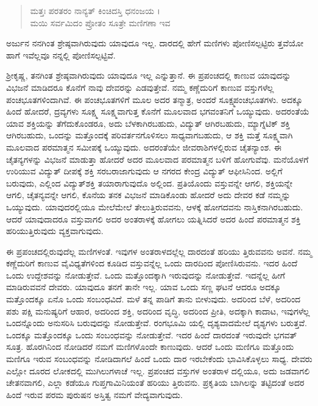 \begin{verse}
ಮತ್ತಃ ಪರತರಂ ನಾನ್ಯತ್ ಕಿಂಚಿದಸ್ತಿ ಧನಂಜಯ ।\\ಮಯಿ ಸರ್ವಮಿದಂ ಪ್ರೋತಂ ಸೂತ್ರೇ ಮಣಿಗಣಾ ಇವ 
\end{verse}

{\small ಅರ್ಜುನ ನನಗಿಂತ ಶ್ರೇಷ್ಠವಾಗಿರುವುದು ಯಾವುದೂ ಇಲ್ಲ. ದಾರದಲ್ಲಿ ಹೇಗೆ ಮಣಿಗಳು ಪೋಣಿಸಲ್ಪಟ್ಟಿರು ತ್ತವೆಯೋ ಹಾಗೆ ಇವೆಲ್ಲವೂ ನನ್ನಲ್ಲಿ ಪೋಣಿಸಲ್ಪಟ್ಟಿವೆ.}

ಶ್ರೀಕೃಷ್ಣ, ತನಗಿಂತ ಶ್ರೇಷ್ಠವಾಗಿರುವುದು ಯಾವುದೂ ಇಲ್ಲ ಎನ್ನುತ್ತಾನೆ. ಈ ಪ್ರಪಂಚದಲ್ಲಿ ಕಾಣುವ ಯಾವುದನ್ನು ವಿಭಜನೆ ಮಾಡಿದರೂ ಕೊನೆಗೆ ನಾವು ದೇವರನ್ನು ಎಡವುತ್ತೇವೆ. ನಮ್ಮ ಕಣ್ಣೆದುರಿಗೆ ಕಾಣುವ ವಸ್ತುಗಳೆಲ್ಲ ಪಂಚಭೂತಗಳಿಂದಾಗಿವೆ. ಈ ಪಂಚಭೂತಗಳಿಗೆ ಮೂಲ ಅದರ ತನ್ಮಾತ್ರ, ಅಂದರೆ ಸೂಕ್ಷ್ಮಪಂಚಭೂತಗಳು. ಅದಕ್ಕೂ ಹಿಂದೆ ಹೋದರೆ, ದ್ರವ್ಯಗಳು ಸೂಕ್ಷ್ಮ ಸೂಕ್ಷ್ಮವಾಗುತ್ತ ಕೊನೆಗೆ ಮೂಲವಾದ ಭಗವಂತನಿಗೆ ಒಯ್ಯುವುದು. ಅದರಂತೆಯೆ ಯಾವ ಶಕ್ತಿಯನ್ನು ತೆಗೆದುಕೊಂಡರೂ, ಅದು ಬೆಳಕಾಗಿರಬಹುದು, ವಿದ್ಯುತ್ ಆಗಿರಬಹುದು, ಮ್ಯಾಗ್ನೆಟಿಕ್ ಶಕ್ತಿ ಆಗಿರಬಹುದು, ಒಂದನ್ನು ಮತ್ತೊಂದಕ್ಕೆ ಪರಿವರ್ತನಗೊಳಿಸಲು ಸಾಧ್ಯವಾಗಬಹುದು, ಆ ಶಕ್ತಿ ಮತ್ತೆ ಸೂಕ್ಷ್ಮವಾಗಿ ಮೂಲವಾದ ಪರಮಾತ್ಮನ ಸಮೀಪಕ್ಕೆ ಒಯ್ಯುವುದು. ಅದರಂತೆಯೇ ಜೀವರಾಶಿಗಳಲ್ಲಿರುವ ಚೈತನ್ಯಾಂಶ. ಈ ಚೈತನ್ಯಗಳನ್ನು ವಿಭಜನೆ ಮಾಡುತ್ತಾ ಹೋದರೆ ಅದರ ಮೂಲವಾದ ಪರಮಾತ್ಮನ ಬಳಿಗೆ ಹೋಗುವೆವು. ಮನೆಯೊಳಗೆ ಉರಿಯುವ ವಿದ್ಯುತ್ ದೀಪಕ್ಕೆ ಶಕ್ತಿ ಸರಬರಾಜಾಗುವುದು ಆ ನಗರದ ಕೇಂದ್ರ ವಿದ್ಯುತ್ ಆಫೀಸಿನಿಂದ. ಅಲ್ಲಿಗೆ ಬರುವುದು, ಎಲ್ಲಿಂದ ವಿದ್ಯುತ್​ಶಕ್ತಿ ತಯಾರಾಗುವುದೊ ಅಲ್ಲಿಂದ. ಪ್ರತಿಯೊಂದು ವಸ್ತುವನ್ನೇ ಆಗಲಿ, ಶಕ್ತಿಯನ್ನೇ ಆಗಲಿ, ಚೈತನ್ಯವನ್ನೇ ಆಗಲಿ, ಕೊನೆಯ ತನಕ ವಿಭಜನೆ ಮಾಡಿಕೊಂಡು ಹೋದರೆ ಅದು ದೇವರ ಕಡೆ ನಮ್ಮನ್ನು ಒಯ್ಯುವುದು. ಯಾವುದರಲ್ಲಿಯೂ ಮೇಲೆಮೇಲೆ ತೇಲುತ್ತಿರುವವನು, ಆಳಕ್ಕೆ ಹೋಗದವನು ನಾಸ್ತಿಕನಾಗಿರಬಹುದು. ಆದರೆ ಯಾವುದಾದರೂ ವಸ್ತುವಾಗಲಿ ಅದರ ಅಂತರಾಳಕ್ಕೆ ಹೋಗಲು ಯತ್ನಿಸಿದರೆ ಅದರ ಹಿಂದೆ ಪರಮಾತ್ಮನ ಶಕ್ತಿ ಹರಿಯುತ್ತಿರುವುದು ವ್ಯಕ್ತವಾಗುವುದು.

ಈ ಪ್ರಪಂಚದಲ್ಲಿರುವುದೆಲ್ಲ ಮಣಿಗಳಂತೆ. ಇವುಗಳ ಅಂತರಾಳದಲ್ಲೆಲ್ಲ ದಾರದಂತೆ ಹರಿಯು ತ್ತಿರುವವನು ಅವನೆ. ನಮ್ಮ ಕಣ್ಣೆದುರಿಗೆ ಕಾಣುವ ವೈವಿಧ್ಯತೆಗಳಿಂದ ಕೂಡಿದ ವಸ್ತುವನ್ನೆಲ್ಲ ಒಂದು ದಾರದಿಂದ ಪೋಣಿಸಿರುವನು. ಇದರ ಹಿಂದೆ ಒಂದು ಉದ್ದೇಶವನ್ನು ನೋಡುತ್ತೇವೆ. ಒಂದು ಮತ್ತೊಂದಕ್ಕಾಗಿ ಇರುವುದನ್ನು ನೋಡುತ್ತೇವೆ. ಇದನ್ನೆಲ್ಲ ಹೀಗೆ ಮಾಡಿರುವವನೆ ದೇವರು. ಯಾವುದೂ ತನಗೆ ತಾನೇ ಇಲ್ಲ. ಯಾವ ಒಂದು ಸಣ್ಣ ಘಟನೆ ಆದರೂ ಅದಕ್ಕೂ ಮತ್ತೊಂದಕ್ಕೂ ಏನೊ ಒಂದು ಸಂಬಂಧವಿದೆ. ಮಳೆ ತನ್ನ ಪಾಡಿಗೆ ತಾನು ಬೀಳುವುದು. ಅದರಿಂದ ಬೆಳೆ, ಅದರಿಂದ ಪಶು ಪಕ್ಷಿ ಮನುಷ್ಯರಿಗೆ ಆಹಾರ, ಅದರಿಂದ ಶಕ್ತಿ, ಅದರಿಂದ ವೃದ್ಧಿ, ಅದರಿಂದ ಪ್ರೀತಿ, ಅದಕ್ಕಾಗಿ ಕಾದಾಟ, ಇವುಗಳೆಲ್ಲ ಒಂದನ್ನೊಂದು ಅನುಸರಿಸಿ ಬರುವುದನ್ನು ನೋಡುತ್ತೇವೆ. ರಂಗಭೂಮಿ ಯಲ್ಲಿ ದೃಶ್ಯವಾದಮೇಲೆ ದೃಶ್ಯಗಳು ಬರುತ್ತವೆ. ಒಂದಕ್ಕೂ ಮತ್ತೊಂದಕ್ಕೂ ಒಂದು ಸಂಬಂಧವನ್ನು ನೋಡುತ್ತೇವೆ. ಇದರ ಹಿಂದೆ ದಾರದಂತೆ ಇರುವುದೇ ಭಗವತ್ ಸೂತ್ರ. ಹೊರಗಿನಿಂದ ನೋಡಿದರೆ ನಮಗೆ ಮಣಿಗಳೊಂದೇ ಕಾಣುವುದು. ಆದರೆ ಒಂದು ಮಣಿಗೂ ಮತ್ತೊಂದು ಮಣಿಗೂ ಇರುವ ಸಂಬಂಧವನ್ನು ನೋಡಿದಾಗಲೆ ಹಿಂದೆ ಒಂದು ದಾರ ಇರಬೇಕೆಂದು ಭಾವಿಸಿಕೊಳ್ಳಲು ಸಾಧ್ಯ. ದೇವರು ಎಲ್ಲೋ ದೂರದ ಲೋಕದಲ್ಲಿ ಮುಗಿಲುಗಳಾಚೆ ಇಲ್ಲ. ಪ್ರಪಂಚದ ವಸ್ತುಗಳ ಅಂತರಾಳ ದಲ್ಲಿಯೂ, ಅದು ಜಡವಾಗಲಿ ಚೇತನವಾಗಲಿ, ಎಲ್ಲಾ ಕಡೆಯೂ ಗುಪ್ತಗಾಮಿನಿಯಂತೆ ಹರಿಯು ತ್ತಿರುವನು. ಪ್ರಕೃತಿಯ ಬಾಗಿಲನ್ನು ತಟ್ಟಿದಂತೆ ಅದರ ಹಿಂದೆ ಇರುವ ಪರಮ ಪುರುಷನ ಅಸ್ತಿತ್ವ ನಮಗೆ ವೇದ್ಯವಾಗುವುದು.

